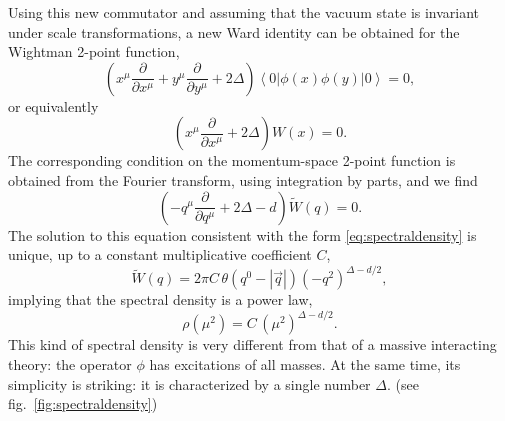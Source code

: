 \documentclass[a4paper,12pt]{article}
\newcommand{\ket}[1]{\left| #1 \right\rangle}
\newcommand{\bra}[1]{\left\langle #1 \right|}
\numberwithin{equation}{section}
\begin{document}
Using this new commutator and assuming that the vacuum state is invariant under scale transformations, a new Ward identity can be obtained for the Wightman 2-point function,
\begin{equation}
	\left( x^\mu \frac{\partial}{\partial x^\mu} 
	+ y^\mu \frac{\partial}{\partial y^\mu}  + 2\Delta \right)
	\bra{0} \phi(x) \phi(y) \ket{0} = 0,
\end{equation}
or equivalently
\begin{equation}
	\left( x^\mu \frac{\partial}{\partial x^\mu} + 2 \Delta \right) 
	W(x) = 0. 
\end{equation}
The corresponding condition on the momentum-space 2-point function
is obtained from the Fourier transform, using integration by parts, and we find
\begin{equation}
	\left( -q^\mu \frac{\partial}{\partial q^\mu} + 2 \Delta - d \right)
	\widetilde{W}(q) = 0. 
	\label{eq:2ptWardIdentity:scale}
\end{equation}
The solution to this equation consistent with the form \eqref{eq:spectraldensity} is unique, up to a constant multiplicative coefficient $C$,
\begin{equation}
	\widetilde{W}(q)
	= 2\pi C \, \theta\left( q^0 - \left| \vec{q} \right| \right)
	(-q^2)^{\Delta - d/2},
\end{equation}
implying that the spectral density is a power law,
\begin{equation}
	\rho(\mu^2) = C \, (\mu^2)^{\Delta - d/2}.
\end{equation}
This kind of spectral density is very different from that of a massive interacting theory: the operator $\phi$ has excitations of all masses.
At the same time, its simplicity is striking: it is characterized by a single number $\Delta$.
(see fig.~\ref{fig:spectraldensity})
\end{document}
